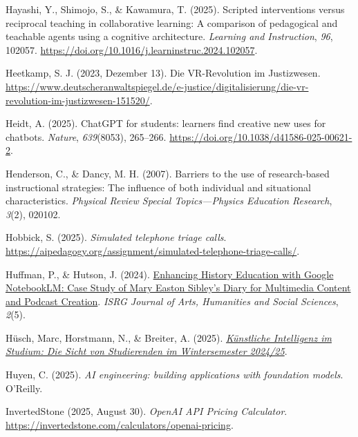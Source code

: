 \documentclass[
  ngerman,
  letterpaper,
  DIV=11]{scrreprt}
\newlength{\cslhangindent}
\newenvironment{CSLReferences}[2] %
 {\begin{list}{}{%
  \setlength{\itemindent}{0pt}
  \setlength{\leftmargin}{0pt}
  \setlength{\parsep}{0pt}
  \ifodd #1
   \setlength{\leftmargin}{\cslhangindent}
   \setlength{\itemindent}{-1\cslhangindent}
  \fi
  \setlength{\itemsep}{#2\baselineskip}}}
 {\end{list}}
\begin{document}
\begin{CSLReferences}{1}{0}
Hayashi, Y., Shimojo, S., \& Kawamura, T. (2025). Scripted interventions
versus reciprocal teaching in collaborative learning: A comparison of
pedagogical and teachable agents using a cognitive architecture.
\emph{Learning and Instruction}, \emph{96}, 102057.
\url{https://doi.org/10.1016/j.learninstruc.2024.102057}.

Heetkamp, S. J. (2023, Dezember 13). Die VR-Revolution im Justizwesen.
\url{https://www.deutscheranwaltspiegel.de/e-justice/digitalisierung/die-vr-revolution-im-justizwesen-151520/}.

Heidt, A. (2025). ChatGPT for students: learners find creative new uses
for chatbots. \emph{Nature}, \emph{639}(8053), 265--266.
\url{https://doi.org/10.1038/d41586-025-00621-2}.

Henderson, C., \& Dancy, M. H. (2007). Barriers to the use of
research-based instructional strategies: The influence of both
individual and situational characteristics. \emph{Physical Review
Special Topics---Physics Education Research}, \emph{3}(2), 020102.

Hobbick, S. (2025). \emph{Simulated telephone triage calls}.
\url{https://aipedagogy.org/assignment/simulated-telephone-triage-calls/}.

Huffman, P., \& Hutson, J. (2024).
\href{https://digitalcommons.lindenwood.edu/faculty-research-papers/683}{Enhancing
History Education with Google NotebookLM: Case Study of Mary Easton
Sibley's Diary for Multimedia Content and Podcast Creation}. \emph{ISRG
Journal of Arts, Humanities and Social Sciences}, \emph{2}(5).

Hüsch, Marc, Horstmann, N., \& Breiter, A. (2025).
\emph{\href{https://hochschuldaten.che.de/kuenstliche-intelligenz-im-studium-die-sicht-von-studierenden-im-wintersemester-2024-25/}{Künstliche
Intelligenz im Studium: Die Sicht von Studierenden im Wintersemester
2024/25}}.

Huyen, C. (2025). \emph{AI engineering: building applications with
foundation models}. O'Reilly.

InvertedStone (2025, August 30). \emph{OpenAI API Pricing Calculator}.
\url{https://invertedstone.com/calculators/openai-pricing}.


\end{CSLReferences}
\end{document}
